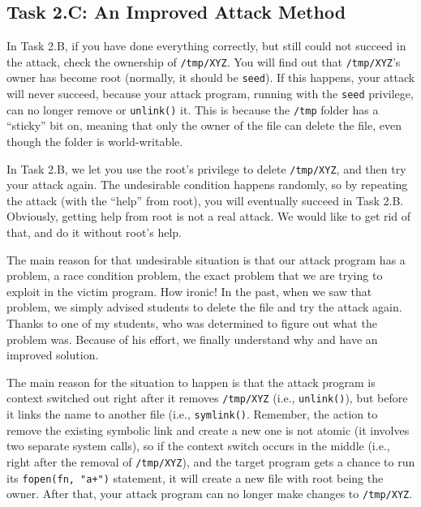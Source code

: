 \subsection{Task 2.C: An Improved Attack Method}

In Task 2.B, if you have done everything correctly, but still could not succeed
in the attack, check the ownership of \texttt{/tmp/XYZ}. You will find out    
that \texttt{/tmp/XYZ}'s owner has become root (normally, it should be \texttt{seed}). 
If this happens, your attack will never succeed, because your attack
program, running with the \texttt{seed} privilege, can no longer remove or
\texttt{unlink()} it.  
This is because the \texttt{/tmp}
folder has a ``sticky'' bit on, meaning that only the owner of the file can
delete the file, even though the folder is world-writable. 


In Task 2.B, we let you use the root's privilege to delete \texttt{/tmp/XYZ}, 
and then try your attack again. The undesirable condition happens randomly,
so by repeating the attack (with the ``help'' from root), you will eventually
succeed in Task 2.B. Obviously, getting help from root is not a real attack. 
We would like to get rid of that, and do it without root's help.


The main reason for that undesirable situation is that 
our attack program has a problem, a race condition problem, the exact problem that
we are trying to exploit in the victim program. How ironic!  
In the past, when we saw that problem, we simply advised students to 
delete the file and try the attack again. Thanks to one of my students, 
who was determined to figure out what the problem was. Because of his effort,
we finally understand why and have an improved solution. 


The main reason for the situation to happen is that the attack program is 
context switched out right after it removes {\tt /tmp/XYZ} (i.e., \texttt{unlink()}),
but before it links the name to another file (i.e., \texttt{symlink()}. 
Remember, the action to remove the existing 
symbolic link and create a new one is not atomic (it involves two 
separate system calls), so if the context switch occurs in the middle
(i.e., right after the removal of {\tt /tmp/XYZ}),
and the target \setuid program gets a chance to run its 
{\tt fopen(fn, "a+")} statement, it will create a new file with root being the owner.
After that, your attack program can no longer make changes to {\tt /tmp/XYZ}.


